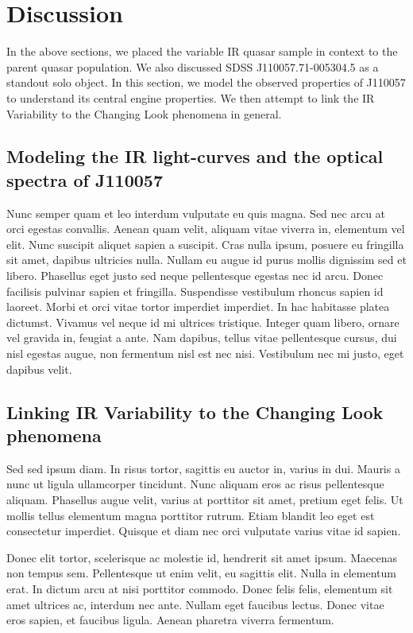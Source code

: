 \documentclass[apj]{emulateapj}
\begin{document}
\section{Discussion}
In the above sections, we placed the variable IR quasar sample in context to 
the parent quasar population. We also discussed SDSS J110057.71-005304.5 
as a standout solo object. In this section, we model the observed properties 
of J110057 to understand its central engine properties. We then attempt to 
link the IR Variability to the Changing Look phenomena in general. 

\subsection{Modeling the IR light-curves and the optical spectra of J110057}
Nunc semper quam et leo interdum vulputate eu quis magna. Sed nec arcu
at orci egestas convallis. Aenean quam velit, aliquam vitae viverra
in, elementum vel elit. Nunc suscipit aliquet sapien a suscipit. Cras
nulla ipsum, posuere eu fringilla sit amet, dapibus ultricies
nulla. Nullam eu augue id purus mollis dignissim sed et
libero. Phasellus eget justo sed neque pellentesque egestas nec id
arcu. Donec facilisis pulvinar sapien et fringilla. Suspendisse
vestibulum rhoncus sapien id laoreet. Morbi et orci vitae tortor
imperdiet imperdiet. In hac habitasse platea dictumst. Vivamus vel
neque id mi ultrices tristique. Integer quam libero, ornare vel
gravida in, feugiat a ante. Nam dapibus, tellus vitae pellentesque
cursus, dui nisl egestas augue, non fermentum nisl est nec
nisi. Vestibulum nec mi justo, eget dapibus velit.

\subsection{Linking IR Variability to the Changing Look phenomena}
Sed sed ipsum diam. In risus tortor, sagittis eu auctor in, varius in dui. Mauris a nunc ut ligula ullamcorper tincidunt. Nunc aliquam eros ac risus pellentesque aliquam. Phasellus augue velit, varius at porttitor sit amet, pretium eget felis. Ut mollis tellus elementum magna porttitor rutrum. Etiam blandit leo eget est consectetur imperdiet. Quisque et diam nec orci vulputate varius vitae id sapien.

Donec elit tortor, scelerisque ac molestie id, hendrerit sit amet ipsum. Maecenas non tempus sem. Pellentesque ut enim velit, eu sagittis elit. Nulla in elementum erat. In dictum arcu at nisi porttitor commodo. Donec felis felis, elementum sit amet ultrices ac, interdum nec ante. Nullam eget faucibus lectus. Donec vitae eros sapien, et faucibus ligula. Aenean pharetra viverra fermentum.
\end{document}
